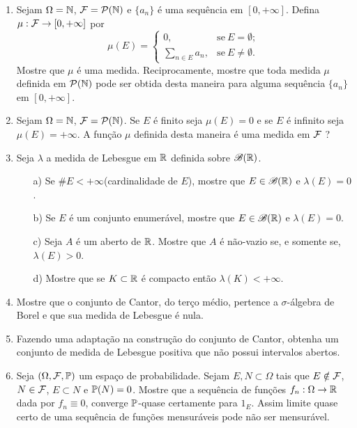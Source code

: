 \begin{enumerate}[leftmargin=*]
\item 
Sejam $\Omega=\N$, $\F=\mathcal{P}(\N)$ e
$\{a_n\}$ é uma sequência em $[0,+\infty]$. 
Defina $\mu:\F\to [0,+\infty]$ por 
\[
	\mu(E)
	=
	\begin{cases}
	0,&\text{se}\ E=\emptyset;
	\\[0.4cm]
	\displaystyle
	\sum_{n\in E} a_n,&\text{se}\ E\neq\emptyset.
	\end{cases}
\]
Mostre que $\mu$ é uma medida.
Reciprocamente, mostre que toda medida 
$\mu$ definida em $\mathcal{P}(\N)$ pode 
ser obtida desta maneira para alguma sequência
$\{a_n\}$ em $[0,+\infty]$. 




\item 
Sejam $\Omega=\N$, $\F=\mathcal{P}(\N)$. 
Se $E$ é finito seja $\mu(E)=0$ e se $E$ é
infinito seja $\mu(E)=+\infty$. 
A função $\mu$ definida desta maneira é uma 
medida em $\F$ ?



\item 
Seja $\lambda$ a medida de Lebesgue em $\R$
definida sobre $\mathscr{B}(\R)$.
	\begin{itemize}
		\item[a)]
		Se $\# E<+\infty$(cardinalidade de $E$), 
		mostre que $E\in \mathscr{B}(\R)$ e $\lambda(E)=0$.
		
		\item[b)]
		Se $E$ é um conjunto enumerável, 
		mostre que $E\in \mathscr{B}(\R)$ e $\lambda(E)=0$.
		
		\item[c)]
		Seja $A$ é um aberto de $\R$. Mostre que $A$ é 
		não-vazio se, e somente se, $\lambda(E)>0$.
		
		\item[d)]
		Mostre que se $K\subset\R$ é compacto então 
		$\lambda(K)<+\infty$.
	\end{itemize}








\item
Mostre que o conjunto de Cantor, do terço médio, pertence a 
$\sigma$-álgebra de Borel e que sua medida de Lebesgue é
nula.



\item 
Fazendo uma adaptação na construção do conjunto de Cantor,
obtenha um conjunto de medida de Lebesgue positiva que 
não possui intervalos abertos.




\item 
Seja $(\Omega,\F,\P)$ um espaço de probabilidade. 
Sejam $E,N\subset \Omega$ tais que 
$E\notin \F$, $N\in\F$, $E\subset N$  e $\P(N)=0$.
Mostre que a sequência de funções $f_n:\Omega\to\R$
dada por $f_n\equiv 0$, converge $\P$-quase certamente
para $1_{E}$. Assim limite quase certo de uma sequência
de funções mensuráveis pode não ser mensurável.












\end{enumerate}



